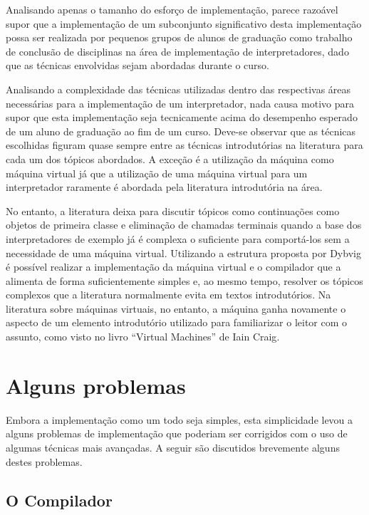 Analisando apenas o tamanho do esforço de implementação, parece
razoável supor que a implementação de um subconjunto significativo desta
implementação possa ser realizada por pequenos grupos de alunos de graduação
como trabalho de conclusão de disciplinas na área de implementação de
interpretadores, dado que as técnicas envolvidas sejam abordadas durante o curso.

Analisando a complexidade das técnicas utilizadas dentro das respectivas áreas
necessárias para a implementação de um interpretador, nada causa motivo para
supor que esta implementação seja tecnicamente acima do desempenho esperado de
um aluno de graduação ao fim de um curso. Deve-se observar que as técnicas
escolhidas figuram quase sempre entre as técnicas introdutórias na literatura
para cada um dos tópicos abordados\cite{jones:gc}\cite{plai}. A exceção é a
utilização da máquina  como máquina virtual já que a utilização de
uma máquina virtual para um interpretador raramente é abordada pela literatura
introdutória na área.

No entanto, a literatura deixa para discutir tópicos como continuações como
objetos de primeira classe e eliminação de chamadas terminais quando a base
dos interpretadores de exemplo já é complexa o suficiente para comportá-los
sem a necessidade de uma máquina virtual. Utilizando a estrutura proposta por
Dybvig\cite{3imp} é possível realizar a implementação da máquina virtual e o 
compilador que a alimenta de forma suficientemente simples e, ao mesmo tempo,
resolver os tópicos complexos que a literatura normalmente evita em textos
introdutórios. Na literatura sobre máquinas virtuais, no entanto, a máquina
 ganha novamente o aspecto de um elemento introdutório utilizado
para familiarizar o leitor com o assunto, como visto no livro ``Virtual Machines''
de Iain Craig\cite{craig:vm}.


\section{Alguns problemas}
\label{sec:problemas-resultados}

Embora a implementação como um todo seja simples, esta simplicidade levou a
alguns problemas de implementação que poderiam ser corrigidos com o uso de
algumas técnicas mais avançadas. A seguir são discutidos brevemente alguns
destes problemas.

\subsection{O Compilador}
\label{ss:compilador-resultados}

